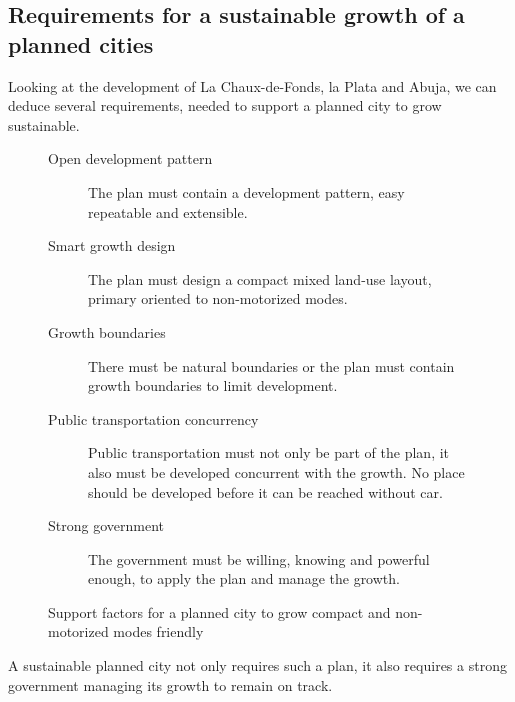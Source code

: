 \documentclass{article}
\begin{document}
\begin{multicols}{2}
		\columnbreak
		\subsection{Requirements for a sustainable growth of a planned cities}
		
		Looking at the development of La Chaux-de-Fonds, la Plata and Abuja, we can deduce several requirements, needed to support a planned city to grow sustainable.
		
			\begin{figure}[H]
				\begin{description}
					\item [Open development pattern] The plan must contain a development pattern, easy repeatable and extensible.
					\item [Smart growth design] The plan must design a compact mixed land-use layout, primary oriented to non-motorized modes.
					\item [Growth boundaries] There must be natural boundaries or the plan must contain growth boundaries to limit development.
					\item [Public transportation concurrency] Public transportation must not only be part of the plan, it also must be developed concurrent with the growth. No place should be developed before it can be reached without car.
					\item [Strong government] The government must be willing, knowing and powerful enough, to apply the plan and manage the growth.
				\end{description}
				\caption{Support factors for a planned city to grow compact and non-motorized modes friendly}
				\label{fig:list:la-chaux-de-fonds-development-reasons}
			\end{figure}
			
			A sustainable planned city not only requires such a plan, it also requires a strong government managing its growth to remain on track.
			
			
	\end{multicols}
	
	

	
	
	\clearpage
	\begin{appendix}
		
		
	
		\listoffigures
	
		\listoftables
	\end{appendix}
\end{document}
